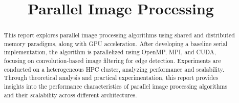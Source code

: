 \documentclass[conference, 10pt, final, a4paper, oneside, twocolumn]{IEEEtran}
\begin{document}
\title{Parallel Image Processing}
\author{
    \and
    \and
}
\maketitle

\begin{abstract}
    This report explores parallel image processing algorithms using shared and %
    distributed memory paradigms, along with GPU acceleration. After developing %
    a baseline serial implementation, the algorithm is parallelized using OpenMP, %
    MPI, and CUDA, focusing on convolution-based image filtering for edge detection. %
    Experiments are conducted on a heterogeneous HPC cluster, analyzing performance %
    and scalability. Through theoretical analysis and practical experimentation, %
    this report provides insights into the performance characteristics of parallel %
    image processing algorithms and their scalability across different architectures.
\end{abstract}







\nocite{*}


\end{document}
